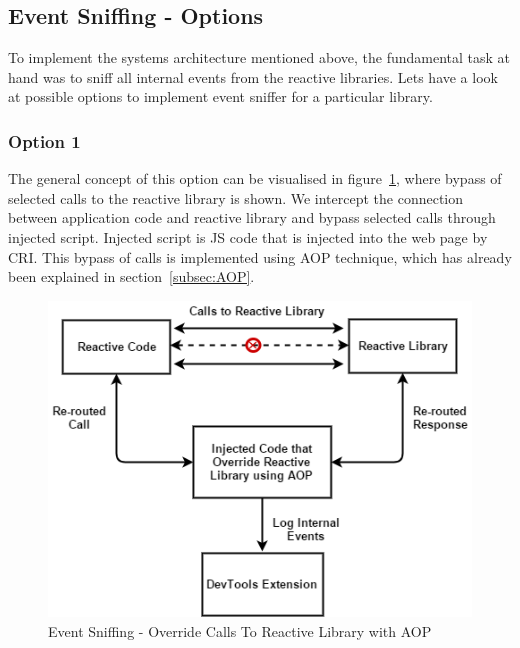 \subsection{Event Sniffing - Options}
To implement the systems architecture mentioned above, the fundamental task at hand was to sniff all internal events from the reactive libraries. Let\textquotesingle s have a look at possible options to implement event sniffer for a particular library.

\subsubsection{Option 1}
The general concept of this option can be visualised in figure~\ref{fig:event_sniffing_1}, where bypass of selected calls to the reactive library is shown. 
We intercept the connection between application code and reactive library and bypass selected calls through injected script. Injected script is JS code that is injected into the web page by CRI. 
This bypass of calls is implemented using AOP technique, which has already been explained in section~\ref{subsec:AOP}.



\begin{figure}[!h]
	\centering
	\includegraphics[scale=0.5,trim=0 0 0 0]{gfx/EventSniffing1.png}
	\caption{Event Sniffing - Override Calls To Reactive Library with AOP}
	\label{fig:event_sniffing_1}
\end{figure}

